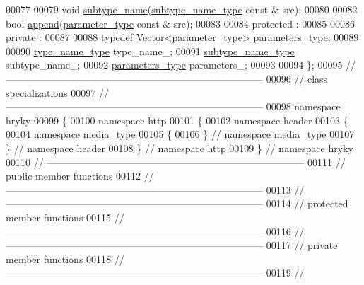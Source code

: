 \begin{DoxyCode}
00077 
00079     \textcolor{keywordtype}{void} \hyperlink{classhryky_1_1http_1_1header_1_1media__type_1_1_entity_a1f9496a572a79e78eb2617ef3dc4231e}{subtype_name}(\hyperlink{classhryky_1_1_vector}{subtype_name_type} \textcolor{keyword}{const} & src);
00080 
00082     \textcolor{keywordtype}{bool} \hyperlink{classhryky_1_1http_1_1header_1_1media__type_1_1_entity_a74842f508285c6f1972c68724579141f}{append}(\hyperlink{classhryky_1_1http_1_1header_1_1parameter_1_1_entity}{parameter_type} \textcolor{keyword}{const} & src);
00083 
00084 \textcolor{keyword}{protected} :
00085 
00086 \textcolor{keyword}{private} :
00087 
00088     \textcolor{keyword}{typedef} \hyperlink{classhryky_1_1_vector}{Vector<parameter_type>} \hyperlink{classhryky_1_1_vector}{parameters_type};
00089 
00090     \hyperlink{classhryky_1_1_vector}{type_name_type} type\_name\_;
00091     \hyperlink{classhryky_1_1_vector}{subtype_name_type} subtype\_name\_;
00092     \hyperlink{classhryky_1_1_vector}{parameters_type} parameters\_;
00093 
00094 \};
00095 \textcolor{comment}{//
      ------------------------------------------------------------------------------}
00096 \textcolor{comment}{// class specializations}
00097 \textcolor{comment}{//
      ------------------------------------------------------------------------------}
00098 \textcolor{keyword}{namespace }hryky
00099 \{
00100 \textcolor{keyword}{namespace }http
00101 \{
00102 \textcolor{keyword}{namespace }header
00103 \{
00104 \textcolor{keyword}{namespace }media\_type
00105 \{
00106 \} \textcolor{comment}{// namespace media\_type}
00107 \} \textcolor{comment}{// namespace header}
00108 \} \textcolor{comment}{// namespace http}
00109 \} \textcolor{comment}{// namespace hryky}
00110 \textcolor{comment}{//
      ------------------------------------------------------------------------------}
00111 \textcolor{comment}{// public member functions}
00112 \textcolor{comment}{//
      ------------------------------------------------------------------------------}
00113 \textcolor{comment}{//
      ------------------------------------------------------------------------------}
00114 \textcolor{comment}{// protected member functions}
00115 \textcolor{comment}{//
      ------------------------------------------------------------------------------}
00116 \textcolor{comment}{//
      ------------------------------------------------------------------------------}
00117 \textcolor{comment}{// private member functions}
00118 \textcolor{comment}{//
      ------------------------------------------------------------------------------}
00119 \textcolor{comment}{//
}
\end{DoxyCode}
